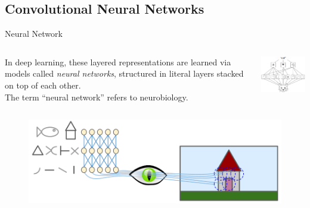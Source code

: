 \documentclass{beamer}
\begin{document}
    \subsection{Convolutional Neural Networks}
    \begin{frame}{Neural Network}
      \begin{columns}
        \begin{column}{0.5\textwidth}
      In deep learning, these layered representations 
      are learned via models called \textit{neural networks}, 
      structured in literal layers stacked on top of each other. \\
      The term “neural network” refers to neurobiology.
        \end{column}
        \begin{column}{0.4\textwidth}
      \includegraphics[width=44mm]{resources/cat}
        \end{column}
      \end{columns}
      \vfill
      \begin{figure}
        \includegraphics{resources/cortex}
      \end{figure}
    \end{frame}
    
\end{document}

